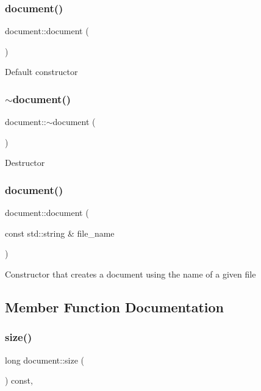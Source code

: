 \subsubsection{\texorpdfstring{document()}{document()}\hspace{0.1cm}{\footnotesize\ttfamily [1/2]}}
{\footnotesize\ttfamily document\+::document (\begin{DoxyParamCaption}{ }\end{DoxyParamCaption})}

Default constructor \mbox{\label{classdocument_afff6a78ede7767d8cbc0cb4566ae64da}} 
\subsubsection{\texorpdfstring{$\sim$document()}{~document()}}
{\footnotesize\ttfamily document\+::$\sim$document (\begin{DoxyParamCaption}{ }\end{DoxyParamCaption})}

Destructor \mbox{\label{classdocument_a750ac91b3537c59d0fff8e4a01085c98}} 
\subsubsection{\texorpdfstring{document()}{document()}\hspace{0.1cm}{\footnotesize\ttfamily [2/2]}}
{\footnotesize\ttfamily document\+::document (\begin{DoxyParamCaption}\item[{const std\+::string \&}]{file\+\_\+name }\end{DoxyParamCaption})}

Constructor that creates a document using the name of a given file 

\subsection{Member Function Documentation}
\mbox{\label{classdocument_aad56f03674964346987dc7afd18aacf1}} 
\subsubsection{\texorpdfstring{size()}{size()}}
{\footnotesize\ttfamily long document\+::size (\begin{DoxyParamCaption}{ }\end{DoxyParamCaption}) const\hspace{0.3cm}{\ttfamily [override]}, {\ttfamily [virtual]}}

